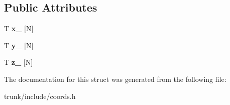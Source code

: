 \subsection*{Public Attributes}
\begin{DoxyCompactItemize}
\item 
\hypertarget{struct_p_r_p_s_evolution_1_1_positioning_1_1_coord_container_ae6e996f4a81e981d860985c2f949b405}{T {\bfseries x\-\_\-} \mbox{[}N\mbox{]}}\label{struct_p_r_p_s_evolution_1_1_positioning_1_1_coord_container_ae6e996f4a81e981d860985c2f949b405}

\item 
\hypertarget{struct_p_r_p_s_evolution_1_1_positioning_1_1_coord_container_a2918ecaef01a1b583c59584db2a32250}{T {\bfseries y\-\_\-} \mbox{[}N\mbox{]}}\label{struct_p_r_p_s_evolution_1_1_positioning_1_1_coord_container_a2918ecaef01a1b583c59584db2a32250}

\item 
\hypertarget{struct_p_r_p_s_evolution_1_1_positioning_1_1_coord_container_aef9d7962c3ed093cd97f502ac70d254d}{T {\bfseries z\-\_\-} \mbox{[}N\mbox{]}}\label{struct_p_r_p_s_evolution_1_1_positioning_1_1_coord_container_aef9d7962c3ed093cd97f502ac70d254d}

\end{DoxyCompactItemize}


The documentation for this struct was generated from the following file\-:\begin{DoxyCompactItemize}
\item 
trunk/include/coords.\-h\end{DoxyCompactItemize}
